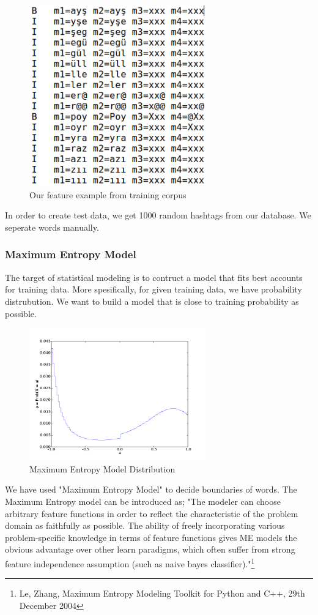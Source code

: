 \documentclass[12pt]{comjnl}
\begin{document}
\begin{figure}[htbp]
\centering
\includegraphics[width=3in]{train.png}
\caption{Our feature example from training corpus}\label{fig:model}
\end{figure}

In order to create test data, we get 1000 random hashtags from our database. We seperate words manually.

\subsubsection{Maximum Entropy Model}

The target of statistical modeling is to contruct a model that fits best accounts for training data. More spesifically, for given training data, we have probability distrubution. We want to build a model that is close to training probability as possible.

\begin{figure}[htbp]
\centering
\includegraphics[width=3in]{mem.jpg}
\caption{Maximum Entropy Model Distribution}\label{fig:model}
\end{figure}

We have used "Maximum Entropy Model" to decide boundaries of words. The Maximum Entropy model can be introduced as; "The modeler can choose arbitrary feature functions in order to reflect the characteristic of the problem domain as faithfully as possible. The ability of freely incorporating various problem-specific knowledge in terms of feature functions gives ME models the obvious advantage over other learn paradigms, which often suffer from strong feature independence assumption (such as naive bayes classifier)."\footnote{Le, Zhang, Maximum Entropy Modeling Toolkit
for Python and C++, 29th December 2004}
\end{document}
